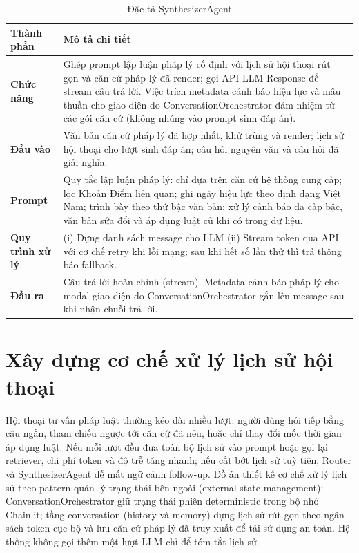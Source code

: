 \documentclass[../DoAn.tex]{subfiles}
\begin{document}
\begin{table}[H]
\centering
\begin{tabularx}{\textwidth}{|>{\raggedright\arraybackslash}p{3.8cm}|>{\raggedright\arraybackslash}X|}
\hline
\textbf{Thành phần} & \textbf{Mô tả chi tiết} \\ \hline
\textbf{Chức năng} & Ghép prompt lập luận pháp lý cố định với lịch sử hội thoại rút gọn và căn cứ pháp lý đã render; gọi API LLM Response để stream câu trả lời. Việc trích metadata cảnh báo hiệu lực và mâu thuẫn cho giao diện do ConversationOrchestrator đảm nhiệm từ các gói căn cứ (không nhúng vào prompt sinh đáp án). \\ \hline
\textbf{Đầu vào} & Văn bản căn cứ pháp lý đã hợp nhất, khử trùng và render; lịch sử hội thoại cho lượt sinh đáp án; câu hỏi nguyên văn và câu hỏi đã giải nghĩa. \\ \hline
\textbf{Prompt} & Quy tắc lập luận pháp lý: chỉ dựa trên căn cứ hệ thống cung cấp; lọc Khoản Điểm liên quan; ghi ngày hiệu lực theo định dạng Việt Nam; trình bày theo thứ bậc văn bản; xử lý cảnh báo đa cấp bậc, văn bản sửa đổi và áp dụng luật cũ khi có trong dữ liệu. \\ \hline
\textbf{Quy trình xử lý} & (i) Dựng danh sách message cho LLM (ii) Stream token qua API với cơ chế retry khi lỗi mạng; sau khi hết số lần thử thì trả thông báo fallback. \\ \hline
\textbf{Đầu ra} & Câu trả lời hoàn chỉnh (stream). Metadata cảnh báo pháp lý cho modal giao diện do ConversationOrchestrator gắn lên message sau khi nhận chuỗi trả lời. \\ \hline
\end{tabularx}
\caption{Đặc tả SynthesizerAgent}
\label{table: synthesizer_agent}
\end{table}

\section{Xây dựng cơ chế xử lý lịch sử hội thoại}
\label{section:conversation-history}

Hội thoại tư vấn pháp luật thường kéo dài nhiều lượt: người dùng hỏi tiếp bằng câu ngắn, tham chiếu ngược tới căn cứ đã nêu, hoặc chỉ thay đổi mốc thời gian áp dụng luật. Nếu mỗi lượt đều đưa toàn bộ lịch sử vào prompt hoặc gọi lại retriever, chi phí token và độ trễ tăng nhanh; nếu cắt bớt lịch sử tuỳ tiện, Router và SynthesizerAgent dễ mất ngữ cảnh follow-up. Đồ án thiết kế cơ chế xử lý lịch sử theo pattern quản lý trạng thái bên ngoài (external state management): ConversationOrchestrator giữ trạng thái phiên deterministic trong bộ nhớ Chainlit; tầng conversation (history và memory) dựng lịch sử rút gọn theo ngân sách token cục bộ và lưu căn cứ pháp lý đã truy xuất để tái sử dụng an toàn. Hệ thống không gọi thêm một lượt LLM chỉ để tóm tắt lịch sử.
\end{document}
